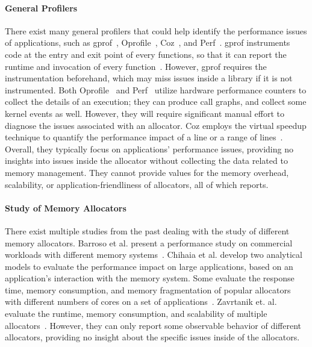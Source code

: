 \paragraph{General Profilers} There exist many general profilers that could help identify the performance issues of applications, such as  gprof~\cite{DBLP:conf/sigplan/GrahamKM82}, Oprofile~\cite{levon2004oprofile}, Coz~\cite{Coz}, and Perf~\cite{perf}. gprof instruments code at the entry and exit point of every functions, so that it can report the runtime and invocation of every function~\cite{DBLP:conf/sigplan/GrahamKM82}. However, gprof requires the instrumentation beforehand, which may miss issues inside a library if it is not instrumented. Both Oprofile~\cite{levon2004oprofile} and Perf~\cite{perf} utilize hardware performance counters to collect the details of an execution; they can produce call graphs, and collect some kernel events as well. However, they will require significant manual effort to diagnose the issues associated with an allocator. Coz employs the virtual speedup technique to quantify the performance impact of a line or a range of lines~\cite{Coz}. Overall, they typically focus on applications' performance issues, providing no insights into issues inside the allocator without collecting the data related to memory management. They cannot provide values for the memory overhead, scalability, or application-friendliness of allocators, all of which \MP{} reports.


\paragraph{Study of Memory Allocators} There exist multiple studies from the past dealing with the study of different memory allocators. Barroso et al. present a performance study on commercial workloads with different memory systems~\cite{Barroso:1998:MSC:279358.279363}. Chihaia et al. develop two analytical models to evaluate the performance impact on large applications, based on an application's interaction with the memory system\cite{1291361}. Some evaluate the response time, memory consumption, and memory fragmentation of popular allocators with different numbers of cores on a set of applications~\cite{6084042, ferreira2011comparison}. Zavrtanik et. al. evaluate the runtime, memory consumption, and scalability of multiple allocators~\cite{zavrtanikexperimental}. 
However, they can only report some observable behavior of different allocators, providing no insight about the specific issues inside of the allocators. 







